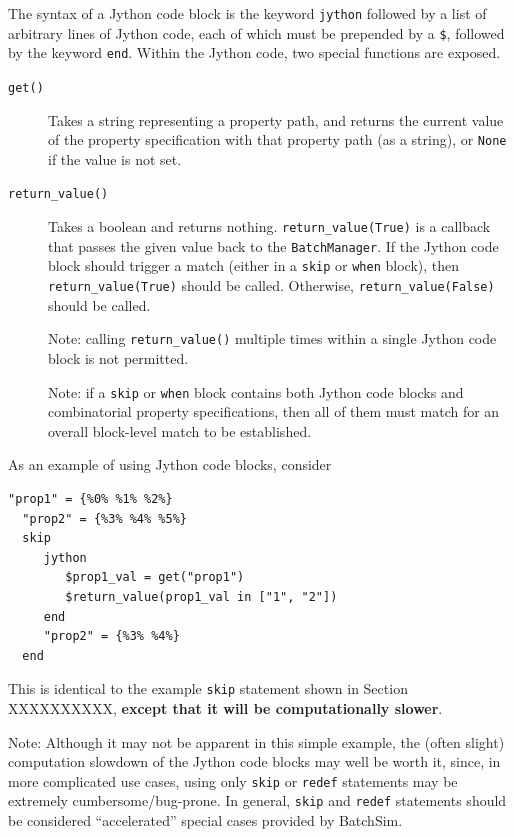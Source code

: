 \documentclass{article}
\newcommand{\BM}{{\tt BatchManager}}
\begin{document}
The syntax of a Jython code block is the keyword {\tt jython} followed by a list of arbitrary lines of Jython code, each of which must be prepended by a {\tt \$}, followed by the keyword {\tt end}. Within the Jython code, two special functions are exposed.

\begin{description}

\item[{\tt get()} ] \mbox{}

Takes a string representing a property path, and returns the current value of the property specification with that property path (as a string), or {\tt None} if the value is not set.

\item[{\tt return\_value()} ] \mbox{}

Takes a boolean and returns nothing. {\tt return\_value(True)} is a callback that passes the given value back to the \BM. If the Jython code block should trigger a match (either in a {\tt skip} or {\tt when} block), then {\tt return\_value(True)} should be called. Otherwise, {\tt return\_value(False)} should be called.

\begin{sideblock}
Note: calling {\tt return\_value()} multiple times within a single Jython code block is not permitted.
\end{sideblock}

\begin{sideblock}
Note: if a {\tt skip} or {\tt when} block contains both Jython code blocks and combinatorial property specifications, then all of them must match for an overall block-level match to be established.
\end{sideblock}

\end{description}

As an example of using Jython code blocks, consider

\begin{lstlisting}[]
  "prop1" = {%0% %1% %2%}
  "prop2" = {%3% %4% %5%}
  skip
     jython
        $prop1_val = get("prop1")
        $return_value(prop1_val in ["1", "2"])
     end
     "prop2" = {%3% %4%}
  end
\end{lstlisting}

This is identical to the example {\tt skip} statement shown in Section XXXXXXXXXX, \textbf{except that it will be computationally slower}.

\begin{sideblock}
Note: Although it may not be apparent in this simple example, the (often slight) computation slowdown of the Jython code blocks may well be worth it, since, in more complicated use cases, using only {\tt skip} or {\tt redef} statements may be extremely cumbersome/bug-prone. In general, {\tt skip} and {\tt redef} statements should be considered ``accelerated'' special cases provided by BatchSim.
\end{sideblock}
\end{document}
